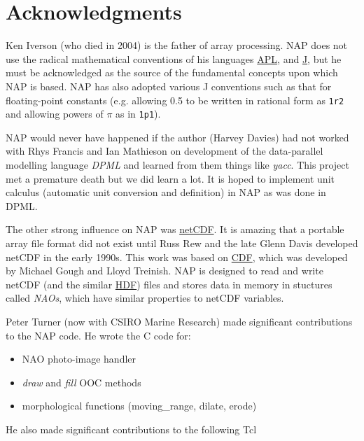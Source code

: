     \section{Acknowledgments}

  Ken Iverson (who died in 2004) is the father of array
  processing. NAP does not use the radical mathematical conventions of
  his languages 
  \href{http://www.acm.org/sigapl/}{APL}, and 
  \href{http://www.jsoftware.com/}{J}, but he must be
  acknowledged as the source of the fundamental concepts upon which NAP
  is based. NAP has also adopted various J conventions such as that for
  floating-point constants (e.g. allowing 0.5 to be written in rational
  form as 
  \texttt{1r2} and allowing powers of $\pi$ as in 
  \texttt{1p1}).
  \par NAP would never have happened if the author (Harvey Davies) had
  not worked with Rhys Francis and Ian Mathieson on development of the
  data-parallel modelling language 
  \textit{DPML} and learned from them things like 
  \textit{yacc}. This project met a premature death but we did learn a
  lot. It is hoped to implement unit calculus (automatic unit
  conversion and definition) in NAP as was done in DPML.
  \par The other strong influence on NAP was 
  \href{http://www.unidata.ucar.edu/packages/netcdf/index.html}{netCDF}.
  It is amazing that a portable array file format did not exist until
  Russ Rew and the late Glenn Davis developed netCDF in the early
  1990s. This work was based on 
  \href{http://nssdc.gsfc.nasa.gov/cdf/cdf-home.html}{CDF}, which
  was developed by Michael Gough and Lloyd Treinish. NAP is designed to
  read and write netCDF (and the similar 
  \href{http://hdf.ncsa.uiuc.edu}{HDF}) files and stores data in
  memory in stuctures called 
  \textit{NAOs}, which have similar properties to netCDF variables.
  \par Peter Turner (now with CSIRO Marine Research) made significant
  contributions to the NAP code. He wrote the C code for:
  \begin{itemize}
    \item NAO photo-image handler
    \item 
    \textit{draw} and 
    \textit{fill} OOC methods
    \item morphological functions (moving\_range, dilate, erode)
  \end{itemize}He also made significant contributions to the following Tcl
